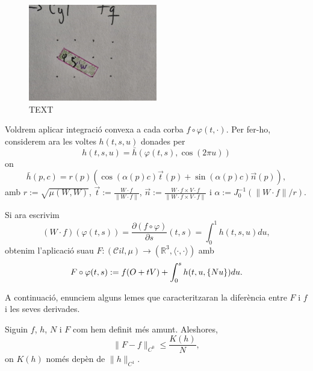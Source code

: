 \begin{figure}[htbp]
    \centering
    \includegraphics[width=0.5\textwidth]{Fotos/VUITENA.jpg}
    \caption{{\color{blue}TEXT}}
    \label{fig:vuitena_foto}
\end{figure}

Voldrem aplicar integració convexa a cada corba $f\circ\varphi(t,\cdot)$. Per fer-ho, considerem ara les voltes $h(t,s,u)$ donades per
\begin{equation}
    h(t,s,u) = \bar h(\varphi(t,s), \cos(2\pi u))
\end{equation}
on 
\begin{equation*}
    \bar h(p, c) = r(p)\left( \cos(\alpha(p)c)\vec t(p) + \sin(\alpha(p)c)\vec n(p) \right),
\end{equation*}
amb $r:=\sqrt{\mu(W,W)}$, $\vec t := \frac{W\cdot f}{\|W\cdot f\|}$, $\vec n := \frac{W\cdot f\times V\cdot f}{\|W\cdot f\times V\cdot f\|}$ i $\alpha:= J_0^{-1}(\|W\cdot f\|/r)$.

Si ara escrivim 
\begin{equation*}
    (W\cdot f)(\varphi(t,s)) = \frac{\partial(f\circ\varphi)}{\partial s}(t,s)= \int_0^1 h(t,s,u) du,
\end{equation*}
obtenim l'aplicació suau $F:(\mathcal Cil, \mu)\to(\mathbb R^3, \langle\cdot, \cdot\rangle)$ amb
\begin{equation}
    F\circ\varphi(t,s) := f(O+tV) + \int_0^s h(t,u,\{Nu\}) du.
\end{equation}

A continuació, enunciem alguns lemes que caracteritzaran la diferència entre $F$ i $f$ i les seves derivades.

\begin{lema}
    \label{lema:lema2}
    Siguin $f$, $h$, $N$ i $F$ com hem definit més amunt. Aleshores,
    \begin{equation*}
        \|F-f\|_{C^0} \le \frac{K(h)}{N},
    \end{equation*}
    on $K(h)$ només depèn de $\|h\|_{C^1}$.
\end{lema}

